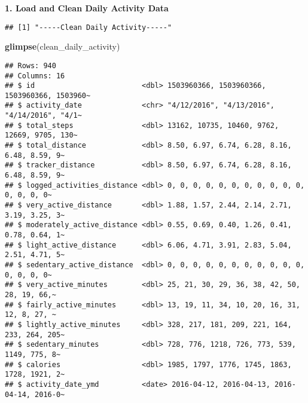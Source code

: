 \documentclass[
]{article}
\newenvironment{Shaded}{\begin{snugshade}}{\end{snugshade}}
\newcommand{\CommentTok}[1]{\textcolor[rgb]{0.56,0.35,0.01}{\textit{#1}}}
\newcommand{\FunctionTok}[1]{\textcolor[rgb]{0.13,0.29,0.53}{\textbf{#1}}}
\newcommand{\NormalTok}[1]{#1}
\newcommand{\OtherTok}[1]{\textcolor[rgb]{0.56,0.35,0.01}{#1}}
\newcommand{\SpecialCharTok}[1]{\textcolor[rgb]{0.81,0.36,0.00}{\textbf{#1}}}
\newcommand{\StringTok}[1]{\textcolor[rgb]{0.31,0.60,0.02}{#1}}
\begin{document}
\textbf{1. Load and Clean Daily Activity Data}

\begin{Shaded}
\end{Shaded}

\begin{verbatim}
## [1] "-----Clean Daily Activity-----"
\end{verbatim}

\begin{Shaded}
\begin{Highlighting}[]
\FunctionTok{glimpse}\NormalTok{(clean\_daily\_activity)}
\end{Highlighting}
\end{Shaded}

\begin{verbatim}
## Rows: 940
## Columns: 16
## $ id                         <dbl> 1503960366, 1503960366, 1503960366, 1503960~
## $ activity_date              <chr> "4/12/2016", "4/13/2016", "4/14/2016", "4/1~
## $ total_steps                <dbl> 13162, 10735, 10460, 9762, 12669, 9705, 130~
## $ total_distance             <dbl> 8.50, 6.97, 6.74, 6.28, 8.16, 6.48, 8.59, 9~
## $ tracker_distance           <dbl> 8.50, 6.97, 6.74, 6.28, 8.16, 6.48, 8.59, 9~
## $ logged_activities_distance <dbl> 0, 0, 0, 0, 0, 0, 0, 0, 0, 0, 0, 0, 0, 0, 0~
## $ very_active_distance       <dbl> 1.88, 1.57, 2.44, 2.14, 2.71, 3.19, 3.25, 3~
## $ moderately_active_distance <dbl> 0.55, 0.69, 0.40, 1.26, 0.41, 0.78, 0.64, 1~
## $ light_active_distance      <dbl> 6.06, 4.71, 3.91, 2.83, 5.04, 2.51, 4.71, 5~
## $ sedentary_active_distance  <dbl> 0, 0, 0, 0, 0, 0, 0, 0, 0, 0, 0, 0, 0, 0, 0~
## $ very_active_minutes        <dbl> 25, 21, 30, 29, 36, 38, 42, 50, 28, 19, 66,~
## $ fairly_active_minutes      <dbl> 13, 19, 11, 34, 10, 20, 16, 31, 12, 8, 27, ~
## $ lightly_active_minutes     <dbl> 328, 217, 181, 209, 221, 164, 233, 264, 205~
## $ sedentary_minutes          <dbl> 728, 776, 1218, 726, 773, 539, 1149, 775, 8~
## $ calories                   <dbl> 1985, 1797, 1776, 1745, 1863, 1728, 1921, 2~
## $ activity_date_ymd          <date> 2016-04-12, 2016-04-13, 2016-04-14, 2016-0~
\end{verbatim}
\end{document}
